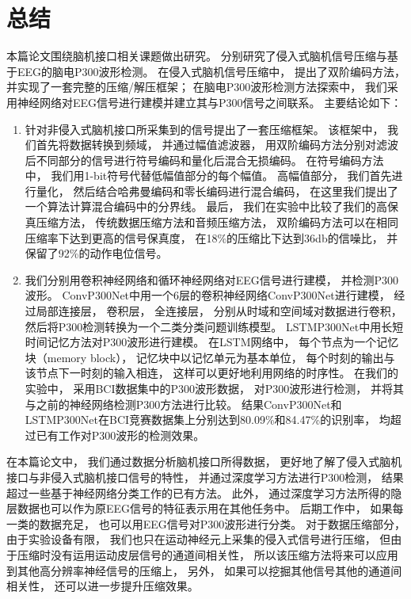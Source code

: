 \chapter{总结}

本篇论文围绕脑机接口相关课题做出研究。 分别研究了侵入式脑机信号压缩与基于EEG的脑电P300波形检测。 在侵入式脑机信号压缩中， 提出了双阶编码方法， 并实现了一套完整的压缩/解压框架； 在脑电P300波形检测方法探索中， 我们采用神经网络对EEG信号进行建模并建立其与P300信号之间联系。 主要结论如下：

\begin{enumerate}
\item 针对非侵入式脑机接口所采集到的信号提出了一套压缩框架。 该框架中， 我们首先将数据转换到频域， 并通过幅值滤波器， 用双阶编码方法分别对滤波后不同部分的信号进行符号编码和量化后混合无损编码。 在符号编码方法中， 我们用1-bit符号代替低幅值部分的每个幅值。 高幅值部分， 我们首先进行量化， 然后结合哈弗曼编码和零长编码进行混合编码， 在这里我们提出了一个算法计算混合编码中的分界线。 最后， 我们在实验中比较了我们的高保真压缩方法， 传统数据压缩方法和音频压缩方法， 双阶编码方法可以在相同压缩率下达到更高的信号保真度， 在18\%的压缩比下达到36db的信噪比， 并保留了92\%的动作电位信号。

\item 我们分别用卷积神经网络和循环神经网络对EEG信号进行建模， 并检测P300波形。 ConvP300Net中用一个6层的卷积神经网络ConvP300Net进行建模， 经过局部连接层， 卷积层， 全连接层， 分别从时域和空间域对数据进行卷积， 然后将P300检测转换为一个二类分类问题训练模型。 LSTMP300Net中用长短时间记忆方法对P300波形进行建模。 在LSTM网络中， 每个节点为一个记忆块（memory block）， 记忆块中以记忆单元为基本单位， 每个时刻的输出与该节点下一时刻的输入相连， 这样可以更好地利用网络的时序性。 在我们的实验中， 采用BCI数据集中的P300波形数据， 对P300波形进行检测， 并将其与之前的神经网络检测P300方法进行比较。 结果ConvP300Net和LSTMP300Net在BCI竞赛数据集上分别达到80.09\%和84.47\%的识别率， 均超过已有工作对P300波形的检测效果。

\end{enumerate}

在本篇论文中， 我们通过数据分析脑机接口所得数据， 更好地了解了侵入式脑机接口与非侵入式脑机接口信号的特性， 并通过深度学习方法进行P300检测， 结果超过一些基于神经网络分类工作的已有方法。 此外， 通过深度学习方法所得的隐层数据也可以作为原EEG信号的特征表示用在其他任务中。 后期工作中， 如果每一类的数据充足， 也可以用EEG信号对P300波形进行分类。 对于数据压缩部分， 由于实验设备有限， 我们也只在运动神经元上采集的侵入式信号进行压缩， 但由于压缩时没有运用运动皮层信号的通道间相关性， 所以该压缩方法将来可以应用到其他高分辨率神经信号的压缩上， 另外， 如果可以挖掘其他信号其他的通道间相关性， 还可以进一步提升压缩效果。


